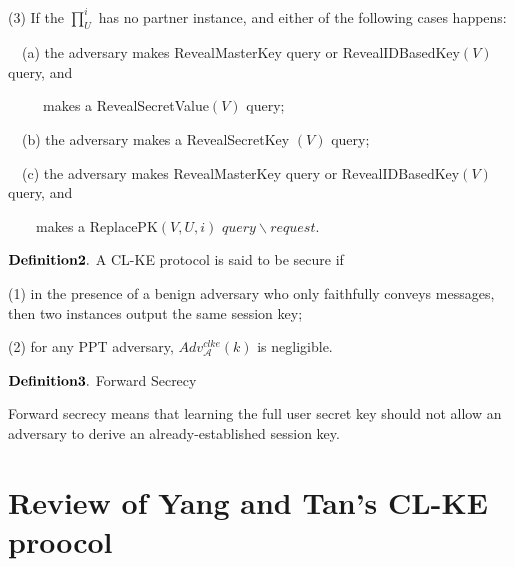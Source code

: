 \documentclass[final,1p,times,twocolumn]{elsarticle}
\begin{document}
\vspace{0.1cm}

(3) If the $\prod_{U}^{i}$ has no partner instance, and either of the following cases happens:

\vspace{0.1cm}

\ \ (a) the adversary makes RevealMasterKey query or RevealIDBasedKey$(V)$ query, and

\ \ \ \ \ makes a RevealSecretValue$(V)$ query;

\vspace{0.1cm}

\ \  (b) the adversary makes a RevealSecretKey $(V)$ query;

\vspace{0.1cm}

\ \ (c) the adversary makes RevealMasterKey query or RevealIDBasedKey$(V)$ query, and

\ \ \ \  makes a ReplacePK$(V,U,i)$ $query\backslash request$.

\vspace{0.2cm}

\noindent$\displaystyle {\bf Definition 2.} $  A CL-KE protocol is said to be secure if

\vspace{0.1cm}

(1) in the presence of a benign adversary who only faithfully conveys messages, then two instances output the same session key;

\vspace{0.1cm}

(2) for any PPT adversary, $Adv_{\mathcal{A}}^{clke}(k)$ is negligible.

\vspace{0.2cm}

\noindent$\displaystyle {\bf Definition 3.} $  Forward Secrecy

\vspace{0.1cm}

Forward secrecy means that learning the full user secret key should not allow an adversary to derive an already-established session key.

\vspace{0.3cm}




\section{Review of Yang and Tan's CL-KE proocol}
\label{3}
\end{document}
